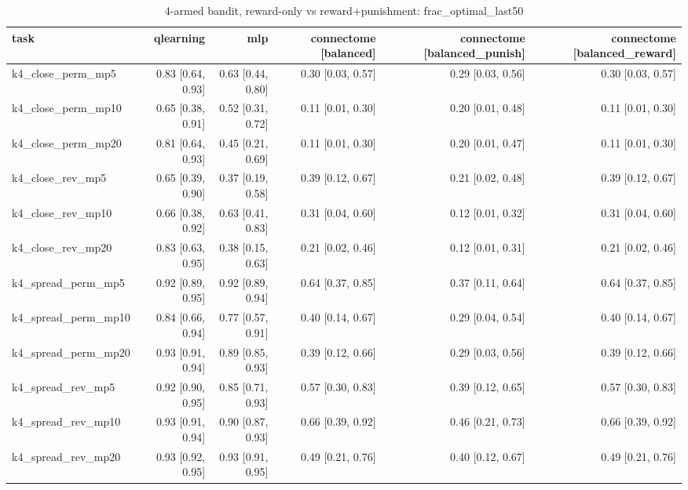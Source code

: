 \begin{table}[t]
\centering
\small
\begin{tabular}{lrrrrr}
\toprule
task & qlearning & mlp & connectome [balanced] & connectome [balanced\_punish] & connectome [balanced\_reward] \\
\midrule
k4\_close\_perm\_mp5 & 0.83 [0.64, 0.93] & 0.63 [0.44, 0.80] & 0.30 [0.03, 0.57] & 0.29 [0.03, 0.56] & 0.30 [0.03, 0.57] \\
k4\_close\_perm\_mp10 & 0.65 [0.38, 0.91] & 0.52 [0.31, 0.72] & 0.11 [0.01, 0.30] & 0.20 [0.01, 0.48] & 0.11 [0.01, 0.30] \\
k4\_close\_perm\_mp20 & 0.81 [0.64, 0.93] & 0.45 [0.21, 0.69] & 0.11 [0.01, 0.30] & 0.20 [0.01, 0.47] & 0.11 [0.01, 0.30] \\
k4\_close\_rev\_mp5 & 0.65 [0.39, 0.90] & 0.37 [0.19, 0.58] & 0.39 [0.12, 0.67] & 0.21 [0.02, 0.48] & 0.39 [0.12, 0.67] \\
k4\_close\_rev\_mp10 & 0.66 [0.38, 0.92] & 0.63 [0.41, 0.83] & 0.31 [0.04, 0.60] & 0.12 [0.01, 0.32] & 0.31 [0.04, 0.60] \\
k4\_close\_rev\_mp20 & 0.83 [0.63, 0.95] & 0.38 [0.15, 0.63] & 0.21 [0.02, 0.46] & 0.12 [0.01, 0.31] & 0.21 [0.02, 0.46] \\
k4\_spread\_perm\_mp5 & 0.92 [0.89, 0.95] & 0.92 [0.89, 0.94] & 0.64 [0.37, 0.85] & 0.37 [0.11, 0.64] & 0.64 [0.37, 0.85] \\
k4\_spread\_perm\_mp10 & 0.84 [0.66, 0.94] & 0.77 [0.57, 0.91] & 0.40 [0.14, 0.67] & 0.29 [0.04, 0.54] & 0.40 [0.14, 0.67] \\
k4\_spread\_perm\_mp20 & 0.93 [0.91, 0.94] & 0.89 [0.85, 0.93] & 0.39 [0.12, 0.66] & 0.29 [0.03, 0.56] & 0.39 [0.12, 0.66] \\
k4\_spread\_rev\_mp5 & 0.92 [0.90, 0.95] & 0.85 [0.71, 0.93] & 0.57 [0.30, 0.83] & 0.39 [0.12, 0.65] & 0.57 [0.30, 0.83] \\
k4\_spread\_rev\_mp10 & 0.93 [0.91, 0.94] & 0.90 [0.87, 0.93] & 0.66 [0.39, 0.92] & 0.46 [0.21, 0.73] & 0.66 [0.39, 0.92] \\
k4\_spread\_rev\_mp20 & 0.93 [0.92, 0.95] & 0.93 [0.91, 0.95] & 0.49 [0.21, 0.76] & 0.40 [0.12, 0.67] & 0.49 [0.21, 0.76] \\
\bottomrule
\end{tabular}
\caption{4-armed bandit, reward-only vs reward+punishment: frac\_optimal\_last50}
\label{tab:bandit_punish_frac_optimal_last50}
\end{table}